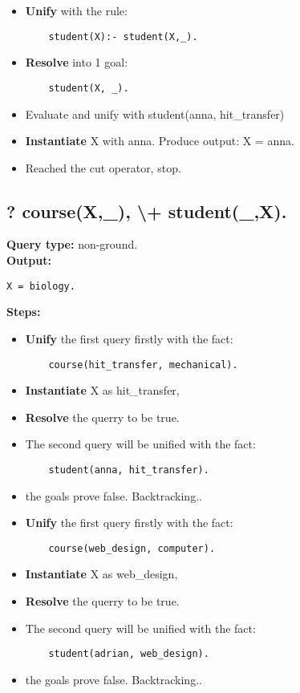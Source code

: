 \begin{itemize}
    \item \textbf{Unify} with the rule:
    \begin{lstlisting}
    student(X):- student(X,_).
    \end{lstlisting}
    \item \textbf{Resolve} into 1 goal:
    \begin{lstlisting}
    student(X, _).
    \end{lstlisting}
    \item Evaluate and unify with student(anna, hit\_transfer)
    \item \textbf{Instantiate} X with anna. Produce output: X = anna.
    \item Reached the cut operator, stop.
\end{itemize}

\subsection{? course(X,\_), \textbackslash+ student(\_,X). } 
\textbf{Query type: } non-ground. \\
\textbf{Output:} 
\begin{lstlisting}
X = biology.
\end{lstlisting}

\textbf{Steps:}
\begin{itemize}
    \item \textbf{Unify} the first query firstly with the fact:
    \begin{lstlisting}
    course(hit_transfer, mechanical).
    \end{lstlisting}
    \item \textbf{Instantiate} X as hit\_transfer, 
    \item \textbf{Resolve} the querry to be true.
    \item The second query will be unified with the fact:
    \begin{lstlisting}
    student(anna, hit_transfer).
    \end{lstlisting}
    \item the goals prove false. Backtracking..
\end{itemize}

\begin{itemize}
    \item \textbf{Unify} the first query firstly with the fact:
    \begin{lstlisting}
    course(web_design, computer).
    \end{lstlisting}
    \item \textbf{Instantiate} X as web\_design, 
    \item \textbf{Resolve} the querry to be true.
    \item The second query will be unified with the fact:
    \begin{lstlisting}
    student(adrian, web_design).
    \end{lstlisting}
    \item the goals prove false. Backtracking..
\end{itemize}

